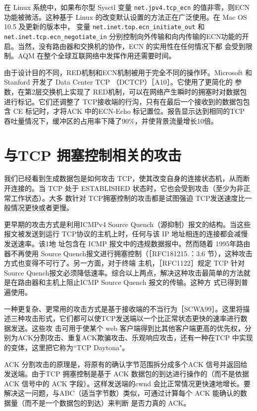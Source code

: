 在 Linux 系统中，如果布尔型 Sysctl 变量 \verb|net.jpv4.tcp_ecn| 的值非零，则ECN 功能被微活。这种基于 Linux 的改变默认设置的方法正在广泛使用。在 Mac OS 10.5 及更新的版本中，
变量 \verb|net.inet.top.ecn_initiate_out| 和 \verb|net.inet.tcp.ecn_negotiate_in| 分别控制向外传输和向内传输的ECN功能的开启。当然，没有路由器和交换机的协作，ECN 的实用性在任何情况下都
会受到限制。AQM 在整个全球互联网络中发挥作用还需要时间。

\begin{tcolorbox}
    由于设计目的不同，RED机制和ECN机制被用于完全不同的操作环。Microsoft 和 Stanford 开发了 Data Center TCP （DCTCP）［A10］。它使用了更简化的
    参数，在第2层交换机上实现了 RED机制，可以在网络产生瞬时的拥塞时对数据包进行标记。它们还调整了 TCP接收端的行沟，只有在最后一个接收到的数据包包含
    CE 标记时，才将ACK 中的ECN-Echo 标记置位。报告显示达到相同的TCP 吞吐量情况下，缓冲区的占用率下降了90\%，并使背景流量增长10倍。
\end{tcolorbox}

\section{与TCP 拥塞控制相关的攻击}
我们已经看到生成数据包是如何攻击 TCP，使其改变自身的连接状态机，从而断开连接的。当 TCP 处于 ESTABLISHED 状态时，它也会受到攻击（至少为非正常工作状态）。大多
数针对 TCP拥塞控制的攻击都是试图强迫 TCP发送速度比一般情况更快或者更慢。

更早期的攻击方式是利用ICMPv4 Source Quench（源抑制）报文的结构。当这些报文被发送到运行 TCP协议的主机上时，任何与该 IP 地址相连的连接都会减慢发送速率。该1地
址包含在 ICMP 报文中的违规数据报中。然而随着 1995年路由器不再使用 Source Quench报文进行拥塞控制（［RFC181215.：3.6 节），这种攻击方式也变得不可行了。另一方面，对于终端
主机，［RFC1122］规定 TCP 针对 Source Quench报文必须降低速率。综合以上两点，解决这种攻击最简单的方法就是在路由器和主机上阻止ICMP Source Quench 报文的传输。这种方
式已得到普遍使用。

一种更复杂、更常用的攻击方式是基于接收端的不当行为［SCWA99］。这里将描述三种攻击形式，它们都可以使TCP发送端以一个比正常状态更快的速率进行数据发送。这些攻
击可用于使某个 web 客户端得到比其他客户端更高的优先权，分别为ACK分割攻击、重复ACK欺骗攻击、乐观响应攻击，还有一种在TCP 中实现的变体，这里把它称为“TCP
Daytona"。

ACK 分割攻击的原理是，将原有的确认字节范围拆分成多个ACK 信号并返回给发送端。由于TCP 拥塞控制是基于 ACK 数据包的到达进行操作的（而不是依据ACK 信号中的
ACK 字段）。这样发送端的cwnd 会比正常情况更快速地增长。要解决这一问题，与ABC（适当字节数）类似，可通过计算每个 ACK 能确认的数据量（而不是一个数据包的到达）来判断
是否力真的 ACK。

